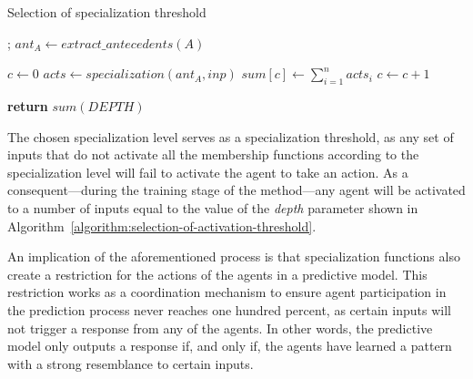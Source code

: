 \documentclass{ieeeaccess}
\begin{document}
\begin{algorithm}
  \caption{Selection of specialization threshold}
  \label{algorithm:selection-of-activation-threshold}
  \begin{algorithmic}[1]
    ;
    \State $ant_A\gets extract\_antecedents(A)$

    \State $c\gets 0$
    \State $acts \gets specialization(ant_A, inp)$
    \State $sum[c] \gets \sum_{i = 1}^{n} acts_i$
    \State $c \gets c + 1$
    \EndFor

    \State \textbf{return} $sum(DEPTH)$
    \EndProcedure
  \end{algorithmic}
\end{algorithm}


The chosen specialization level serves as a specialization threshold, as any set of inputs that do not activate all the membership functions according to the specialization level will fail to activate the agent to take an action. As a consequent---during the training stage of the method---any agent will be activated to a number of inputs equal to the value of the \textit{depth} parameter shown in Algorithm~\ref{algorithm:selection-of-activation-threshold}.

An implication of the aforementioned process is that specialization functions also create a restriction for the actions of the agents in a predictive model. This restriction works as a coordination mechanism to ensure agent participation in the prediction process never reaches one hundred percent, as certain 
inputs will not trigger a response from any of the agents. In other words, the predictive model only outputs a response if, and only if, the agents have learned a pattern with a strong resemblance to certain inputs.
\end{document}
